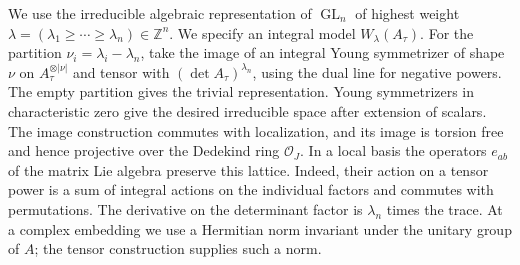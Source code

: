 \documentclass[a4paper,11pt]{article}
\theoremstyle{definition}
\theoremstyle{remark}
\newcommand{\ZZ}{\mathbb Z}\newcommand{\ord}{\operatorname{ord}}
\numberwithin{equation}{section}
\newcommand{\GL}{\operatorname{GL}}
\newcommand{\OO}{\mathcal O}
\begin{document}
We use the irreducible algebraic representation of \(\GL_n\) of highest weight \(\lambda=(\lambda_1\ge\cdots\ge\lambda_n)\in\ZZ^n\). We specify an integral model \(W_\lambda(A_\tau)\). For the partition \(\nu_i=\lambda_i-\lambda_n\), take the image of an integral Young symmetrizer of shape \(\nu\) on \(A_\tau^{\otimes|\nu|}\) and tensor with \((\det A_\tau)^{\lambda_n}\), using the dual line for negative powers. The empty partition gives the trivial representation. Young symmetrizers in characteristic zero give the desired irreducible space after extension of scalars. The image construction commutes with localization, and its image is torsion free and hence projective over the Dedekind ring \(\OO_J\). In a local basis the operators \(e_{ab}\) of the matrix Lie algebra preserve this lattice. Indeed, their action on a tensor power is a sum of integral actions on the individual factors and commutes with permutations. The derivative on the determinant factor is \(\lambda_n\) times the trace. At a complex embedding we use a Hermitian norm invariant under the unitary group of \(A\); the tensor construction supplies such a norm.
\end{document}
